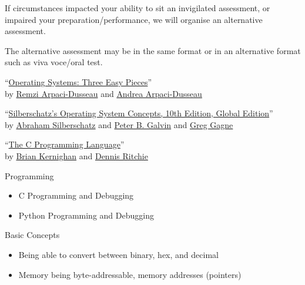 \begin{slide}
  

    If circumstances impacted your ability to sit an invigilated assessment, or impaired your preparation/performance, we will organise an alternative assessment. 
	
	\medskip
	
	The alternative assessment may be in the same format or in an alternative format such as viva voce/oral test.
  
\end{slide}

\begin{slide}
  

    ``\href{https://pages.cs.wisc.edu/~remzi/OSTEP/}
           {Operating Systems: Three Easy Pieces}'' \\
    by \href{http://www.cs.wisc.edu/~remzi/}{Remzi Arpaci-Dusseau}
    and \href{http://www.cs.wisc.edu/~dusseau/}{Andrea Arpaci-Dusseau}
    \bigskip

    ``\href{https://www.wiley.com/en-ie/Silberschatz's+Operating+System+Concepts%2C+Global+Edition%2C+10th+Edition-p-9781119454083}
            {Silberschatz's Operating System Concepts, 10th Edition, Global Edition}'' \\
    by \href{https://seas.yale.edu/faculty-research/faculty-directory/abraham-silberschatz}{Abraham Silberschatz} 
    and \href{https://dl.acm.org/profile/81100611528}{Peter B. Galvin}
    and \href{https://greggagne.github.io/}{Greg Gagne}
    \bigskip
    
    ``\href{https://en.wikipedia.org/wiki/The_C_Programming_Language}
           {The C Programming Language}'' \\
    by \href{https://en.wikipedia.org/wiki/Brian_Kernighan}{Brian Kernighan}
    and \href{https://en.wikipedia.org/wiki/Dennis_Ritchie}{Dennis Ritchie}

\end{slide}

\begin{slide}
  

    Programming
    \begin{itemize}
        \item C Programming and Debugging
        \item Python Programming and Debugging
    \end{itemize}
    
    \bigskip

    Basic Concepts
    \begin{itemize}
        \item Being able to convert between binary, hex, and decimal
        \item Memory being byte-addressable, memory addresses (pointers)
    \end{itemize}
        
\end{slide}

